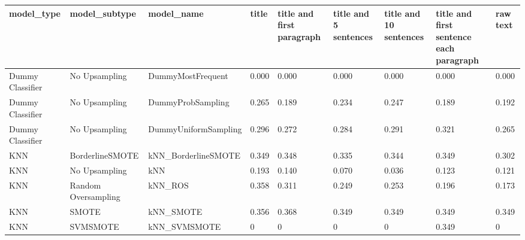 \begin{tabular}{lllllllll}
\toprule
                  model\_type &       model\_subtype &                                   model\_name & title & title and first paragraph & title and 5 sentences & title and 10 sentences & title and first sentence each paragraph &  raw text \\
\midrule
            Dummy Classifier &       No Upsampling &                            DummyMostFrequent & 0.000 &                     0.000 &                 0.000 &                  0.000 &                                   0.000 &     0.000 \\
            Dummy Classifier &       No Upsampling &                            DummyProbSampling & 0.265 &                     0.189 &                 0.234 &                  0.247 &                                   0.189 &     0.192 \\
            Dummy Classifier &       No Upsampling &                         DummyUniformSampling & 0.296 &                     0.272 &                 0.284 &                  0.291 &                                   0.321 &     0.265 \\
                         KNN &     BorderlineSMOTE &                          kNN\_BorderlineSMOTE & 0.349 &                     0.348 &                 0.335 &                  0.344 &                                   0.349 &     0.302 \\
                         KNN &       No Upsampling &                                          kNN & 0.193 &                     0.140 &                 0.070 &                  0.036 &                                   0.123 &     0.121 \\
                         KNN & Random Oversampling &                                      kNN\_ROS & 0.358 &                     0.311 &                 0.249 &                  0.253 &                                   0.196 &     0.173 \\
                         KNN &               SMOTE &                                    kNN\_SMOTE & 0.356 &                     0.368 &                 0.349 &                  0.349 &                                   0.349 &     0.349 \\
                         KNN &            SVMSMOTE &                                 kNN\_SVMSMOTE &     0 &                         0 &                     0 &                      0 &                                   0.349 &         0 \\

\end{tabular}
